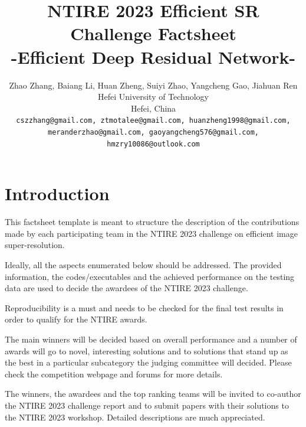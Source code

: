 \documentclass[10pt,twocolumn,letterpaper]{article}
\begin{document}
\title{NTIRE 2023 Efficient SR Challenge Factsheet\\-Efficient Deep Residual Network-}
\author{Zhao Zhang, Baiang Li, Huan Zheng, Suiyi Zhao, Yangcheng Gao, Jiahuan Ren\\
Hefei University of Technology\\
Hefei, China\\
{\tt\small cszzhang@gmail.com, ztmotalee@gmail.com,  huanzheng1998@gmail.com, meranderzhao@gmail.com, gaoyangcheng576@gmail.com, hmzry10086@outlook.com}

}
\maketitle
\section{Introduction}

This factsheet template is meant to structure the description of the contributions made by each participating team in the NTIRE 2023 challenge on efficient image super-resolution. 

Ideally, all the aspects enumerated below should be addressed.
The provided information, the codes/executables and the achieved performance on the testing data are used to decide the awardees of the NTIRE 2023 challenge. 

Reproducibility is a must and needs to be checked for the final test results in order to qualify for the NTIRE awards. 

The main winners will be decided based on overall performance and a number of awards will go to novel, interesting solutions and to solutions that stand up as the best in a particular subcategory the judging committee will decided. Please check the competition webpage and forums for more details.

The winners, the awardees and the top ranking teams will be invited to co-author the NTIRE 2023 challenge report and to submit papers with their solutions to the NTIRE 2023 workshop. Detailed descriptions are much appreciated.
\end{document}
